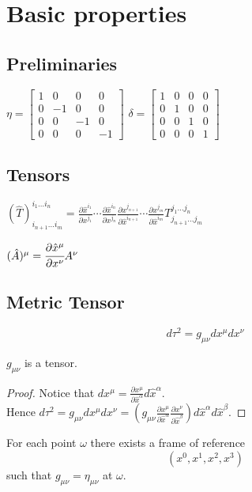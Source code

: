 \documentclass[main.tex]{subfiles}
\begin{document}
\section{Basic properties}
\subsection{Preliminaries}
$\eta =
\left[
\begin{array}{cccc}
1 & 0 & 0 & 0 \\
0 & -1 & 0 & 0 \\
0 & 0 & -1 & 0 \\
0 & 0 & 0 & -1
\end{array}
\right] 
$
$\delta =
\left[
\begin{array}{cccc}
1 & 0 & 0 & 0 \\
0 & 1 & 0 & 0 \\
0 & 0 & 1 & 0 \\
0 & 0 & 0 & 1
\end{array}
\right] 
$
\subsection{Tensors}
$(\hat{T})^{i_1\dots i_n}_{i_{n+1}\dots i_m} =
\frac{\partial \hat{x}^{i_1}}{\partial x^{j_1}}
\cdots
\frac{\partial \hat{x}^{i_n}}{\partial x^{j_n}}
\frac{\partial x^{j_{n+1}}}{\partial \hat{x}^{i_{n+1}}}
\cdots
\frac{\partial x^{j_m}}{\partial \hat{x}^{i_m}}
T^{j_1\dots j_n}_{j_{n+1}\dots j_m}$

\noindent
$(\hat{A})^\mu =  \cfrac{\partial \hat{x}^\mu}{\partial x^\nu}A^\nu$

\subsection{Metric Tensor}
$$
\boxed{d\tau^2 =  g_{\mu\nu} dx^\mu dx^\nu}
$$

\begin{theorem}
$g_{\mu\nu}$ is a tensor.
\end{theorem}
\begin{proof}
Notice that $dx^\mu = \frac{\partial x^\mu}{\partial \hat{x}^\alpha} d\hat{x}^\alpha$.\\
Hence $d\tau^2 = g_{\mu\nu} dx^\mu dx^\nu = (g_{\mu\nu} \frac{\partial x^\mu}{\partial \hat{x}^\alpha}\frac{\partial x^\nu}{\partial \hat{x}^\beta}) d\hat{x}^\alpha d\hat{x}^\beta$.
\end{proof}

\begin{theorem}
For each point $\omega$ there exists a frame of reference 
$$(x^0, x^1, x^2, x^3)$$ 
such that $g_{\mu\nu} = \eta_{\mu\nu}$ at $\omega$.
\end{theorem}
\end{document}
